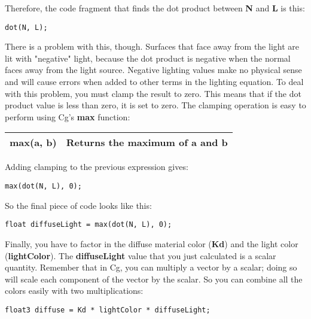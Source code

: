 \documentclass[../main.tex]{subfiles}
\begin{document}
Therefore, the code fragment that finds the dot product between \textbf{N} and \textbf{L} is this:

\FloatBarrier
\begin{lstlisting}
dot(N, L);
\end{lstlisting}
\FloatBarrier

There is a problem with this, though. Surfaces that face away from the light are lit with "negative" light, because the dot product is negative when the normal faces away from the light source. Negative lighting values make no physical sense and will cause errors when added to other terms in the lighting equation. To deal with this problem, you must clamp the result to zero. This means that if the dot product value is less than zero, it is set to zero. The clamping operation is easy to perform using Cg's \textbf{max} function:

\FloatBarrier
\begin{table}
\centering
\begin{tabular}{ p{5cm} p{7cm}  } 
\hline
\textbf{max(a, b)} & Returns the maximum of \textbf{a} and \textbf{b} \\
\hline
\end{tabular}
\end{table}
\FloatBarrier

Adding clamping to the previous expression gives:

\FloatBarrier
\begin{lstlisting}
max(dot(N, L), 0);
\end{lstlisting}
\FloatBarrier

So the final piece of code looks like this:

\FloatBarrier
\begin{lstlisting}
float diffuseLight = max(dot(N, L), 0);
\end{lstlisting}
\FloatBarrier

Finally, you have to factor in the diffuse material color (\textbf{Kd}) and the light color (\textbf{lightColor}). The \textbf{diffuseLight} value that you just calculated is a scalar quantity. Remember that in Cg, you can multiply a vector by a scalar; doing so will scale each component of the vector by the scalar. So you can combine all the colors easily with two multiplications:

\FloatBarrier
\begin{lstlisting}
float3 diffuse = Kd * lightColor * diffuseLight;
\end{lstlisting}
\FloatBarrier
\end{document}
